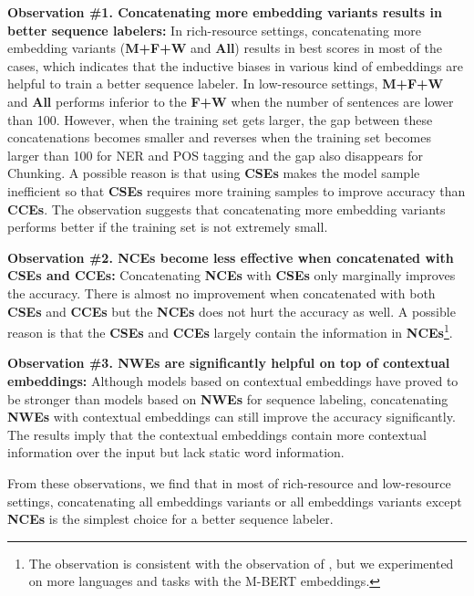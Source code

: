 \documentclass[11pt,a4paper]{article}
\begin{document}
\noindent\textbf{Observation \#1. Concatenating more embedding variants results in better sequence labelers:} In rich-resource settings, concatenating more embedding variants (\textbf{M+F+W} and \textbf{All}) results in best scores in most of the cases, which indicates that the inductive biases in various kind of embeddings are helpful to train a better sequence labeler.
In low-resource settings, \textbf{M+F+W} and \textbf{All} performs inferior to the \textbf{F+W} when the number of sentences are lower than 100. However, when the training set gets larger, the gap between these concatenations becomes smaller and reverses when the training set becomes larger than 100 for NER and POS tagging and the gap also disappears for Chunking. A possible reason is that using \textbf{CSEs} makes the model sample inefficient so that \textbf{CSEs} requires more training samples to improve accuracy than \textbf{CCEs}. The observation suggests that concatenating more embedding variants performs better if the training set is not extremely small.

\noindent\textbf{Observation \#2. \textbf{NCEs} become less effective when concatenated with \textbf{CSEs} and \textbf{CCEs}:} Concatenating \textbf{NCEs} with \textbf{CSEs} only marginally improves the accuracy. There is almost no improvement when concatenated with both \textbf{CSEs} and \textbf{CCEs} but the \textbf{NCEs} does not hurt the accuracy as well. A possible reason is that the \textbf{CSEs} and \textbf{CCEs} largely contain the information in \textbf{NCEs}\footnote{The observation is consistent with the observation of \citet{akbik-etal-2018-contextual}, but we experimented on more languages and tasks with the M-BERT embeddings.}.


\noindent\textbf{Observation \#3. \textbf{NWEs} are significantly helpful on top of contextual embeddings:} Although models based on contextual embeddings have proved to be stronger than models based on \textbf{NWEs} for sequence labeling, concatenating \textbf{NWEs} with contextual embeddings can still improve the accuracy significantly. The results imply that the contextual embeddings contain more contextual information over the input but lack static word information.

From these observations, we find that in most of rich-resource and low-resource settings, concatenating all embeddings variants or all embeddings variants except \textbf{NCEs} is the simplest choice for a better sequence labeler.
\end{document}
